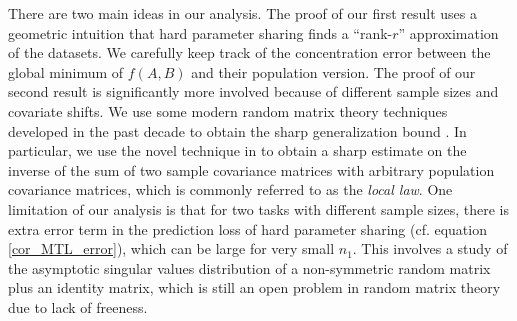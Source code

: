 



There are two main ideas in our analysis. The proof of our first result uses a geometric intuition that hard parameter sharing finds a ``rank-$r$'' approximation of the datasets.
We carefully keep track of the concentration error between the global minimum of $f(A, B)$ and their population version.
The proof of our second result is significantly more involved because of different sample sizes and covariate shifts. We use some modern random matrix theory techniques developed in the past decade to obtain the sharp generalization bound \cite{erdos2017dynamical}. In particular, we use the novel technique in \cite{Anisotropic} to obtain a sharp estimate on the inverse of the sum of two sample covariance matrices with arbitrary population covariance matrices, which is commonly referred to as the \emph{local law}. 
One limitation of our analysis is that for two tasks with different sample sizes, there is extra error term in the prediction loss of hard parameter sharing (cf. equation \eqref{cor_MTL_error}), which can be large for very small $n_1$. This involves a study of the asymptotic singular values distribution of a non-symmetric random matrix plus an identity matrix, which is still an open problem in random matrix theory due to lack of freeness. 

